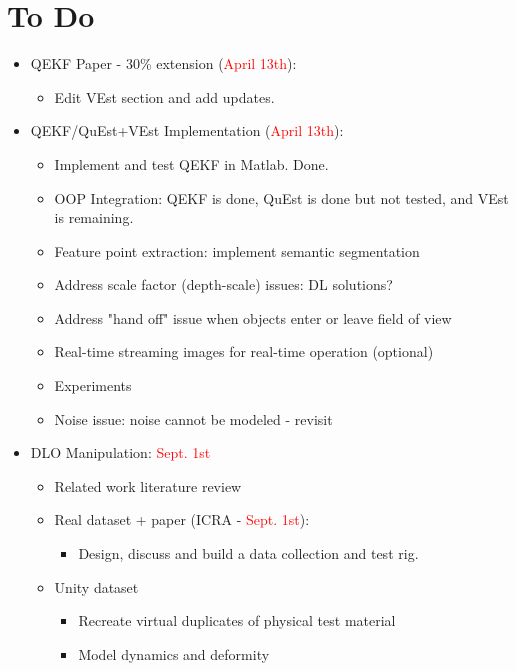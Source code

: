 \documentclass[11pt]{article}
\begin{document}
\section{To Do}
\begin{itemize}
  \item QEKF Paper - 30\% extension (\textcolor{red}{April 13th}):
  \begin{itemize}
      \item Edit VEst section and add updates.
  \end{itemize}
  \item QEKF/QuEst+VEst Implementation (\textcolor{red}{April 13th}):
  \begin{itemize}
      \item Implement and test QEKF in Matlab. Done.
      \item OOP Integration: QEKF is done, QuEst is done but not tested, and
VEst is remaining.
      \item Feature point extraction: implement semantic segmentation
      \item Address scale factor (depth-scale) issues: DL solutions?
      \item Address "hand off" issue when objects enter or leave field of view
      \item Real-time streaming images for real-time operation (optional)
      \item Experiments
      \item Noise issue: noise cannot be modeled - revisit
  \end{itemize}
  \item  DLO Manipulation:  \textcolor{red}{Sept. 1st}
  \begin{itemize}
      \item Related work literature review
      \item Real dataset + paper (ICRA -  \textcolor{red}{Sept. 1st}):
      \begin{itemize}
            \item Design, discuss and build a data collection and test rig.
      \end{itemize}
      \item Unity dataset
      \begin{itemize}
            \item Recreate virtual duplicates of physical test material
            \item Model dynamics and deformity
      \end{itemize}
  \end{itemize}
\end{itemize}
\end{document}
